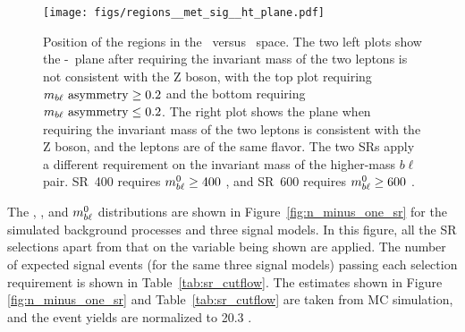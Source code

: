 \begin{figure}[ht]
  \centering
  \texttt{[image: figs/regions\_\_met\_sig\_\_ht\_plane.pdf]}
  \caption{Position of the regions in the \METSIG\ versus \HT\ space. The two
    left plots show the \METSIG-\HT~plane after requiring the invariant mass
    of the two leptons is not consistent with the Z boson, with the top plot
    requiring $m_{b\ell}~\mathrm{asymmetry} \geq 0.2$ and the bottom requiring $m_{b\ell}~\mathrm{asymmetry} \leq 0.2$.
    The right plot shows the plane when requiring the invariant mass of the
    two leptons is consistent with the Z boson, and the leptons are of the
    same flavor. The two SRs apply a different requirement on the
    invariant mass of the higher-mass $b\ell$ pair. SR~400 requires
    $m_{b\ell}^{0} \geq 400$ \GeV, and SR~600 requires $m_{b\ell}^{0} \geq 600$ \GeV.
  }
  \label{fig:region_coverage}
\end{figure}

The \HT, \MBLASYM, and $m_{b\ell}^0$ distributions are shown in
Figure~\ref{fig:n_minus_one_sr} for the simulated background processes
and three signal models.  In this figure, all the SR
selections apart from that on the variable being shown are applied.
The number of expected signal events (for the same three signal models)
passing each selection requirement is shown in Table~\ref{tab:sr_cutflow}.
The estimates shown in Figure \ref{fig:n_minus_one_sr} and
Table~\ref{tab:sr_cutflow} are taken from MC simulation, and the event
yields are normalized to 20.3 \ifb.


